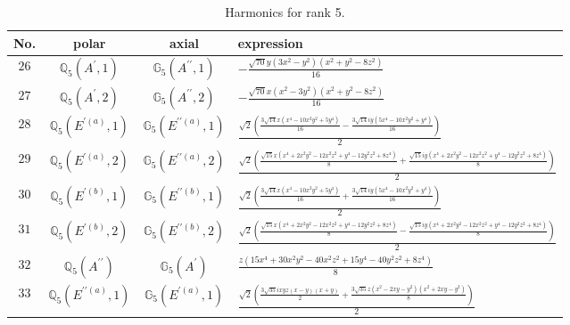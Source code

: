 \documentclass[fleqn,8pt,landscape]{jsarticle}
\begin{document}
\begin{table}[ht!]
\begin{center}
\caption{Harmonics for rank 5.}
\renewcommand{\arraystretch}{1.3}
\begin{tabular}{cccl} \hline \hline
No. & polar & axial & expression \\ \hline
$ 26 $ & $ \mathbb{Q}_{5}(A^{\prime},1) $ & $ \mathbb{G}_{5}(A^{\prime\prime},1) $ & $ - \frac{\sqrt{70} y \left(3 x^{2} - y^{2}\right) \left(x^{2} + y^{2} - 8 z^{2}\right)}{16} $ \\
$ 27 $ & $ \mathbb{Q}_{5}(A^{\prime},2) $ & $ \mathbb{G}_{5}(A^{\prime\prime},2) $ & $ - \frac{\sqrt{70} x \left(x^{2} - 3 y^{2}\right) \left(x^{2} + y^{2} - 8 z^{2}\right)}{16} $ \\
$ 28 $ & $ \mathbb{Q}_{5}(E^{\prime(a)},1) $ & $ \mathbb{G}_{5}(E^{\prime\prime(a)},1) $ & $ \frac{\sqrt{2} \left(\frac{3 \sqrt{14} x \left(x^{4} - 10 x^{2} y^{2} + 5 y^{4}\right)}{16} - \frac{3 \sqrt{14} i y \left(5 x^{4} - 10 x^{2} y^{2} + y^{4}\right)}{16}\right)}{2} $ \\
$ 29 $ & $ \mathbb{Q}_{5}(E^{\prime(a)},2) $ & $ \mathbb{G}_{5}(E^{\prime\prime(a)},2) $ & $ \frac{\sqrt{2} \left(\frac{\sqrt{15} x \left(x^{4} + 2 x^{2} y^{2} - 12 x^{2} z^{2} + y^{4} - 12 y^{2} z^{2} + 8 z^{4}\right)}{8} + \frac{\sqrt{15} i y \left(x^{4} + 2 x^{2} y^{2} - 12 x^{2} z^{2} + y^{4} - 12 y^{2} z^{2} + 8 z^{4}\right)}{8}\right)}{2} $ \\
$ 30 $ & $ \mathbb{Q}_{5}(E^{\prime(b)},1) $ & $ \mathbb{G}_{5}(E^{\prime\prime(b)},1) $ & $ \frac{\sqrt{2} \left(\frac{3 \sqrt{14} x \left(x^{4} - 10 x^{2} y^{2} + 5 y^{4}\right)}{16} + \frac{3 \sqrt{14} i y \left(5 x^{4} - 10 x^{2} y^{2} + y^{4}\right)}{16}\right)}{2} $ \\
$ 31 $ & $ \mathbb{Q}_{5}(E^{\prime(b)},2) $ & $ \mathbb{G}_{5}(E^{\prime\prime(b)},2) $ & $ \frac{\sqrt{2} \left(\frac{\sqrt{15} x \left(x^{4} + 2 x^{2} y^{2} - 12 x^{2} z^{2} + y^{4} - 12 y^{2} z^{2} + 8 z^{4}\right)}{8} - \frac{\sqrt{15} i y \left(x^{4} + 2 x^{2} y^{2} - 12 x^{2} z^{2} + y^{4} - 12 y^{2} z^{2} + 8 z^{4}\right)}{8}\right)}{2} $ \\
$ 32 $ & $ \mathbb{Q}_{5}(A^{\prime\prime}) $ & $ \mathbb{G}_{5}(A^{\prime}) $ & $ \frac{z \left(15 x^{4} + 30 x^{2} y^{2} - 40 x^{2} z^{2} + 15 y^{4} - 40 y^{2} z^{2} + 8 z^{4}\right)}{8} $ \\
$ 33 $ & $ \mathbb{Q}_{5}(E^{\prime\prime(a)},1) $ & $ \mathbb{G}_{5}(E^{\prime(a)},1) $ & $ \frac{\sqrt{2} \left(\frac{3 \sqrt{35} i x y z \left(x - y\right) \left(x + y\right)}{2} + \frac{3 \sqrt{35} z \left(x^{2} - 2 x y - y^{2}\right) \left(x^{2} + 2 x y - y^{2}\right)}{8}\right)}{2} $ \\

\end{tabular}
\end{center}
\end{table}
\end{document}
